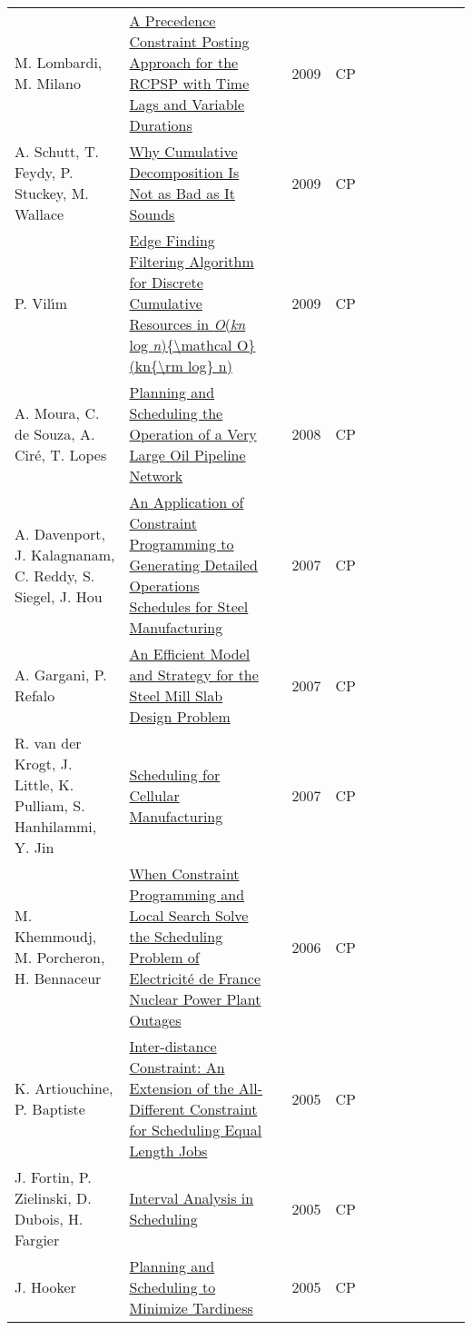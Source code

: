 {\begin{longtable}{p{3cm}p{6cm}rrcrlcccp{1.5cm}l}
M. Lombardi, M. Milano& \href{papers/LombardiM09.pdf}{A Precedence Constraint Posting Approach for the {RCPSP} with Time Lags and Variable Durations} & \cite{LombardiM09} & 2009 & CP & & & & & & & \\
A. Schutt, T. Feydy, P. Stuckey, M. Wallace& \href{papers/SchuttFSW09.pdf}{Why Cumulative Decomposition Is Not as Bad as It Sounds} & \cite{SchuttFSW09} & 2009 & CP & & & & & & & \\
P. Vil{\'{\i}}m& \href{papers/Vilim09.pdf}{Edge Finding Filtering Algorithm for Discrete Cumulative Resources in \emph{O}(\emph{kn} log \emph{n})\{{\textbackslash}mathcal O\}(kn\{{\textbackslash}rm log\} n)} & \cite{Vilim09} & 2009 & CP & & & & & & & \\
A. Moura, C. de Souza, A. Cir{\'{e}}, T. Lopes& \href{papers/MouraSCL08.pdf}{Planning and Scheduling the Operation of a Very Large Oil Pipeline Network} & \cite{MouraSCL08} & 2008 & CP & & & & & & & \\
A. Davenport, J. Kalagnanam, C. Reddy, S. Siegel, J. Hou& \href{papers/DavenportKRSH07.pdf}{An Application of Constraint Programming to Generating Detailed Operations Schedules for Steel Manufacturing} & \cite{DavenportKRSH07} & 2007 & CP & & & & & & & \\
A. Gargani, P. Refalo& \href{papers/GarganiR07.pdf}{An Efficient Model and Strategy for the Steel Mill Slab Design Problem} & \cite{GarganiR07} & 2007 & CP & & & & & & & \\
R. van der Krogt, J. Little, K. Pulliam, S. Hanhilammi, Y. Jin& \href{papers/KrogtLPHJ07.pdf}{Scheduling for Cellular Manufacturing} & \cite{KrogtLPHJ07} & 2007 & CP & & & & & & & \\
M. Khemmoudj, M. Porcheron, H. Bennaceur& \href{papers/KhemmoudjPB06.pdf}{When Constraint Programming and Local Search Solve the Scheduling Problem of Electricit{\'{e}} de France Nuclear Power Plant Outages} & \cite{KhemmoudjPB06} & 2006 & CP & & & & & & & \\
K. Artiouchine, P. Baptiste& \href{papers/ArtiouchineB05.pdf}{Inter-distance Constraint: An Extension of the All-Different Constraint for Scheduling Equal Length Jobs} & \cite{ArtiouchineB05} & 2005 & CP & & & & & & & \\
J. Fortin, P. Zielinski, D. Dubois, H. Fargier& \href{papers/FortinZDF05.pdf}{Interval Analysis in Scheduling} & \cite{FortinZDF05} & 2005 & CP & & & & & & & \\
J. Hooker& \href{papers/cp-Hooker05.pdf}{Planning and Scheduling to Minimize Tardiness} & \cite{cp-Hooker05} & 2005 & CP & & & & & & & \\

\end{longtable}}
